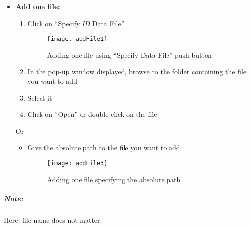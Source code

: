 \documentclass[fadttsterUserGuide_use]{subfiles}
\begin{document}
	\begin{itemize}
		\item \textbf{Add one file:}
		\begin{enumerate}
			\item Click on ``Specify \textit{ID} Data File''
			\begin{figure}[H]
  				\texttt{[image: addFile1]}
  				\caption{Adding one file using ``Specify Data File'' push button}
    			\label{fig:specifyDataFile_pushButton}
			\end{figure}
			\item In the pop-up window displayed, browse to the folder containing the file you want to add
			\item Select it
			\item Click on ``Open'' or double click on the file
		\end{enumerate}	
			Or
		\begin{itemize}
			\item[] Give the absolute path to the file you want to add
			\begin{figure}[H]
  				\texttt{[image: addFile3]}
  				\caption{Adding one file specifying the absolute path}
    			\label{fig:specifyDataFile_absolutePath}
			\end{figure}
		\end{itemize}
	\end{itemize}
	\subparagraph{\textbf{Note:}} Here, file name does not matter.
	\vfill
	\newpage
	
\end{document}
